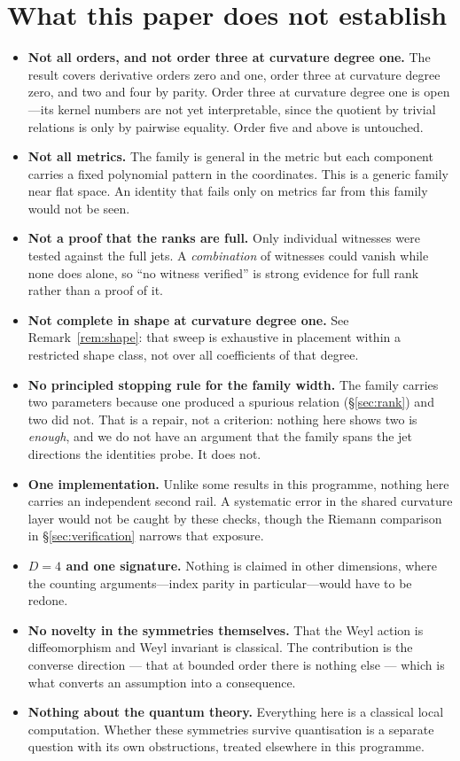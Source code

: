 \documentclass[11pt]{article}
\theoremstyle{definition}
\theoremstyle{remark}
\begin{document}
\section{What this paper does not establish}
\label{sec:not}

\begin{itemize}\itemsep2pt
\item \textbf{Not all orders, and not order three at curvature degree one.}
  The result covers derivative orders zero and one, order three at curvature
  degree zero, and two and four by parity.  Order three at curvature degree
  one is open---its kernel numbers are not yet interpretable, since the
  quotient by trivial relations is only by pairwise equality.  Order five and
  above is untouched.
\item \textbf{Not all metrics.}  The family is general in the metric but each
  component carries a fixed polynomial pattern in the coordinates.  This is a
  generic family near flat space.  An identity that fails only on metrics far
  from this family would not be seen.
\item \textbf{Not a proof that the ranks are full.}  Only individual witnesses
  were tested against the full jets.  A \emph{combination} of witnesses could
  vanish while none does alone, so ``no witness verified'' is strong evidence
  for full rank rather than a proof of it.
\item \textbf{Not complete in shape at curvature degree one.}  See
  Remark~\ref{rem:shape}: that sweep is exhaustive in placement within a
  restricted shape class, not over all coefficients of that degree.
\item \textbf{No principled stopping rule for the family width.}  The family
  carries two parameters because one produced a spurious relation
  (\S\ref{sec:rank}) and two did not.  That is a repair, not a criterion:
  nothing here shows two is \emph{enough}, and we do not have an argument that
  the family spans the jet directions the identities probe.  It does not.
\item \textbf{One implementation.}  Unlike some results in this programme,
  nothing here carries an independent second rail.  A systematic error in the
  shared curvature layer would not be caught by these checks, though the
  Riemann comparison in \S\ref{sec:verification} narrows that exposure.
\item \textbf{\(D=4\) and one signature.}  Nothing is claimed in other
  dimensions, where the counting arguments---index parity in particular---would
  have to be redone.
\item \textbf{No novelty in the symmetries themselves.}  That the Weyl action
  is diffeomorphism and Weyl invariant is classical.  The contribution is the
  converse direction --- that at bounded order there is nothing else --- which
  is what converts an assumption into a consequence.
\item \textbf{Nothing about the quantum theory.}  Everything here is a
  classical local computation.  Whether these symmetries survive quantisation
  is a separate question with its own obstructions, treated elsewhere in this
  programme.
\end{itemize}
\end{document}
